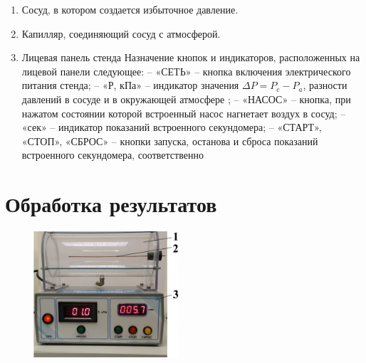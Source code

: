 \documentclass[a4paper]{article}
\begin{document}
\begin{enumerate}
    \item  Сосуд, в котором создается избыточное давление.
    \item Капилляр, соединяющий сосуд с атмосферой.
    \item Лицевая панель стенда Назначение кнопок и индикаторов, расположенных на лицевой панели следующее: – «СЕТЬ» – кнопка
включения электрического питания стенда; – «Р, кПа» – индикатор значения $\Delta P = P_c-P_a$, разности давлений в сосуде
и в окружающей атмосфере ; – «НАСОС» – кнопка, при нажатом состоянии которой встроенный насос нагнетает воздух в
сосуд; – «сек» – индикатор показаний встроенного секундомера;
– «СТАРТ», «СТОП», «СБРОС» – кнопки запуска, останова и
сброса показаний встроенного секундомера, соответственно
\end{enumerate}


\section{\textbf{Обработка результатов}}

\begin{figure}[H]
    \begin{center}
        \includegraphics[width=0.48\textwidth]{pick_4}
    \end{center}
\end{figure}
\end{document}
